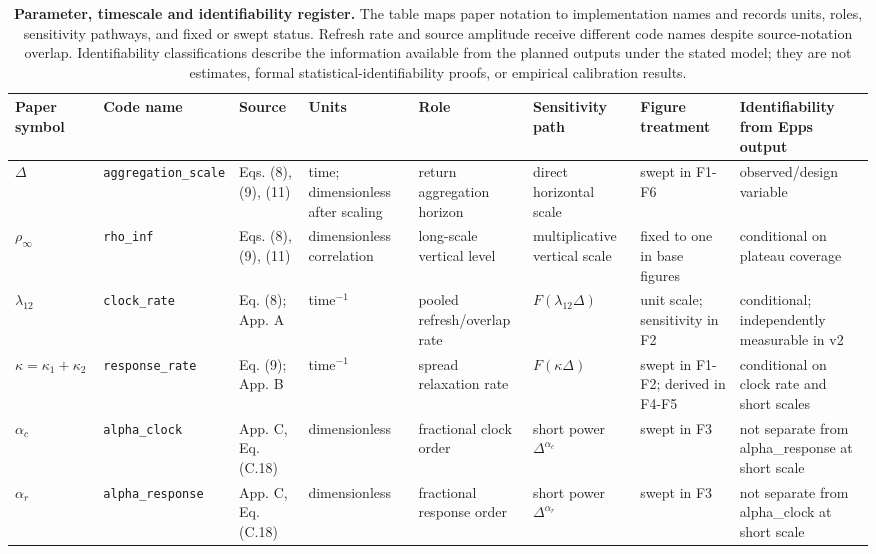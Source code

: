 \begin{table}[H]
\centering
\scriptsize
\caption{\textbf{Parameter, timescale and identifiability register.} The table maps paper notation to implementation names and records units, roles, sensitivity pathways, and fixed or swept status. Refresh rate and source amplitude receive different code names despite source-notation overlap. Identifiability classifications describe the information available from the planned outputs under the stated model; they are not estimates, formal statistical-identifiability proofs, or empirical calibration results.}
\label{tab:parameter-register}
\renewcommand{\arraystretch}{0.98}
\begin{tabularx}{\linewidth}{@{}p{1.7cm}p{3.3cm}p{2.3cm}p{2.5cm}X X X X@{}}
\toprule
Paper symbol & Code name & Source & Units & Role & Sensitivity path & Figure treatment & Identifiability from Epps output \\
\midrule
\(\Delta\) & \texttt{aggregation\_\allowbreak{}scale} & Eqs. (8), (9), (11) & time; dimensionless after scaling & return aggregation horizon & direct horizontal scale & swept in F1-F6 & observed/design variable \\
\(\rho_\infty\) & \texttt{rho\_\allowbreak{}inf} & Eqs. (8), (9), (11) & dimensionless correlation & long-scale vertical level & multiplicative vertical scale & fixed to one in base figures & conditional on plateau coverage \\
\(\lambda_{12}\) & \texttt{clock\_\allowbreak{}rate} & Eq. (8); App. A & time\(^{-1}\) & pooled refresh/overlap rate & \(F(\lambda_{12}\Delta)\) & unit scale; sensitivity in F2 & conditional; independently measurable in v2 \\
\(\kappa=\kappa_1+\kappa_2\) & \texttt{response\_\allowbreak{}rate} & Eq. (9); App. B & time\(^{-1}\) & spread relaxation rate & \(F(\kappa\Delta)\) & swept in F1-F2; derived in F4-F5 & conditional on clock rate and short scales \\
\(\alpha_c\) & \texttt{alpha\_\allowbreak{}clock} & App. C, Eq. (C.18) & dimensionless & fractional clock order & short power \(\Delta^{\alpha_c}\) & swept in F3 & not separate from alpha\_response at short scale \\
\(\alpha_r\) & \texttt{alpha\_\allowbreak{}response} & App. C, Eq. (C.18) & dimensionless & fractional response order & short power \(\Delta^{\alpha_r}\) & swept in F3 & not separate from alpha\_clock at short scale \\

\end{tabularx}
\end{table}
